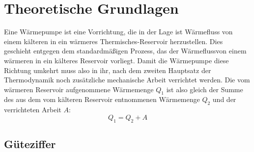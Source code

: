 \section{Theoretische Grundlagen}

Eine Wärmepumpe ist eine Vorrichtung, die in der Lage ist Wärmefluss von einem kälteren in ein
wärmeres Thermisches-Reservoir herzustellen. Dies geschieht entgegen dem standardmäßigen Prozess,
das der Wärmeflussvon einem wärmeren in ein 
kälteres Reservoir vorliegt. Damit die Wärmepumpe diese Richtung umkehrt muss also in ihr,
nach dem zweiten Hauptsatz der Thermodynamik noch zusätzliche
mechanische Arbeit verrichtet werden.
Die vom wärmeren Reservoir aufgenommene Wärmemenge $Q_1$ ist also gleich der
Summe des aus dem vom kälteren Reservoir entnommenen Wärmemenge $Q_2$ und der verrichteten Arbeit $A$:
\begin{equation}
  Q_1 = Q_2 + A  
  \label{eqn:transp}
\end{equation}

\subsection{Güteziffer}

